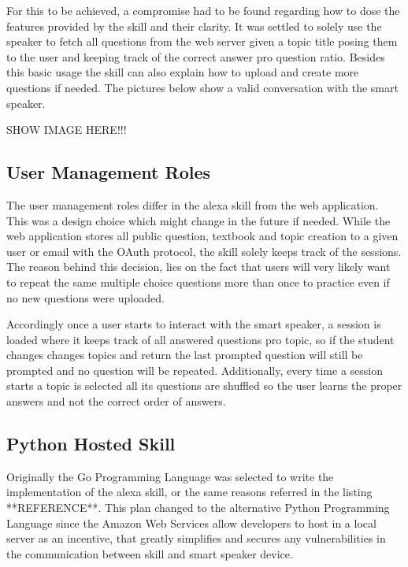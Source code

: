 For this to be achieved, a compromise had to be found regarding how to dose the 
features provided by the skill and their clarity. It was settled to solely use 
the speaker to fetch all questions from the web server given a topic title posing
them to the user and keeping track of the correct answer pro question ratio.
Besides this basic usage the skill can also explain how to upload and create more
questions if needed. The pictures below show a valid conversation with the smart
speaker.

SHOW IMAGE HERE!!!


\subsection{User Management Roles}

The user management roles differ in the alexa skill from the web application.
This was a design choice which might change in the future if needed. While
the web application stores all public question, textbook and topic creation to
a given user or email with the OAuth protocol, the skill solely keeps track
of the sessions. The reason behind this decision, lies on the fact that 
users will very likely want to repeat the same multiple choice questions more 
than once to practice even if no new questions were uploaded. 

Accordingly once a user starts to interact with the smart speaker, a session is
loaded where it keeps track of all answered questions pro topic, so if the student
changes changes topics and return the last prompted question will still be prompted
and no question will be repeated. Additionally, every time a session starts a topic
is selected all its questions are shuffled so the user learns the proper answers
and not the correct order of answers.

\subsection{Python Hosted Skill}

Originally the Go Programming Language was selected to write the implementation 
of the alexa skill, or the same reasons referred in the listing **REFERENCE**.
This plan changed to the alternative Python Programming Language since the 
Amazon Web Services allow developers to host in a local server as an incentive, 
that greatly simplifies and secures any vulnerabilities in the communication
between skill and smart speaker device.

